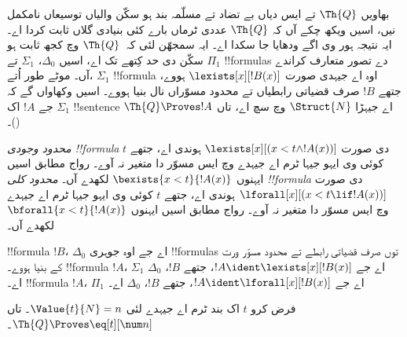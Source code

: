 \documentclass[../../../include/open-logic-section]{subfiles}
\begin{document}

بھاویں $\Th{Q}$ تے ایس دیاں بے تضاد تے مسلّمہ بند ہو سکّن والیاں
توسیعاں نامکمل نیں، اسیں ویکھ چکے آں کہ $\Th{Q}$ عددی ٹرماں بارے
کئی بنیادی گلاں ثابت کردا اے۔ ایہ نتیجہ ہور وی اگے ودھایا جا
سکدا اے۔ ایہ سمجھّن لئی کہ~$\Th{Q}$ وچ کجھ ثابت ہو سکّن دی حد
کِتھے تک اے، اسیں $\Delta_0$، $\Sigma_1$ تے $\Pi_1$ !!{formula}s
دے تصور متعارف کراندے آں۔ موٹے طور اُتے، $\Sigma_1$ !!{formula}
اوہ اے جیہدی صورت $\lexists[x][!B(x)]$ ہووے، جتھے $!B$ صرف
قضیاتی رابطیاں تے محدود مسوّراں نال بنیا ہووے۔ اسیں وکھاواں گے
کہ جے $!A$ اک $\Sigma_1$ !!{sentence} اے جیہڑا $\Struct{N}$
وچ سچ اے، تاں $\Th{Q} \Proves !A$ ()۔

\begin{defn}
\emph{محدود وجودی !!{formula}} دی صورت
$\lexists[x][(x < t \land !A(x))]$ ہوندی اے، جتھے $t$ کوئی وی
ایہو جیہا ٹرم اے جیہدے وچ ایس مسوّر دا متغیر نہ آوے۔ رواج
مطابق اسیں ایہنوں $\bexists{x < t}{!A(x)}$ لکھدے آں۔
%
\emph{محدود کلی !!{formula}} دی صورت
$\lforall[x][(x < t \lif !A(x))]$ ہوندی اے، جتھے $t$ کوئی وی
ایہو جیہا ٹرم اے جیہدے وچ ایس مسوّر دا متغیر نہ آوے۔ رواج
مطابق اسیں ایہنوں $\bforall{x < t}{!A(x)}$ لکھدے آں۔
\end{defn}

\begin{defn}
!!{formula} $!B$، $\Delta_0$ اے جے اوہ جوہری !!{formula}s توں
صرف قضیاتی رابطے تے محدود مسوّر ورت کے بنیا ہووے۔
%
!!{formula} $!A$، $\Sigma_1$ اے جے $!A \ident \lexists[x][!B(x)]$،
جتھے $!B$، $\Delta_0$ اے۔
%
!!{formula} $!A$، $\Pi_1$ اے جے $!A \ident \lforall[x][!B(x)]$،
جتھے $!B$، $\Delta_0$ اے۔
\end{defn}

\begin{lem}
 فرض کرو $t$ اک بند ٹرم اے
جیہدے لئی $\Value{t}{N} = n$۔ تاں $\Th{Q} \Proves \eq[t][\num n]$۔
\end{lem}
\end{document}
